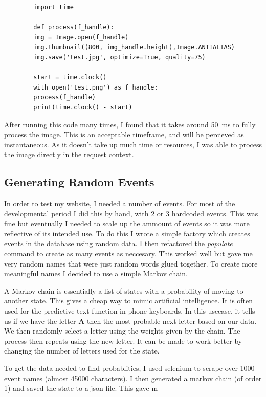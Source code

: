 \documentclass[a4paper,oneside,12pt,draft]{report}
\begin{document}
	\lstset{language=python}
	\begin{lstlisting}
		import time

		def process(f_handle):
		img = Image.open(f_handle)
		img.thumbnail((800, img_handle.height),Image.ANTIALIAS)
		img.save('test.jpg', optimize=True, quality=75)

		start = time.clock()
		with open('test.png') as f_handle:
		process(f_handle)
		print(time.clock() - start)
	\end{lstlisting}

	After running this code many times, I found that it takes around \SI{50}{\milli\second} to fully process the image. This is an acceptable timeframe, and will be percieved as instantaneous. As it doesn't take up much time or resources, I was able to process the image directly in the request context.

	\subsection{Generating Random Events}
	In order to test my website, I needed a number of events. For most of the developmental period I did this by hand, with 2 or 3 hardcoded events. This was fine but eventually I needed to scale up the ammount of events so it was more reflective of its intended use. To do this I wrote a simple factory which creates events in the database using random data. I then refactored the \textit{populate} command to create as many events as neccesary. This worked well but gave me very random names that were just random words glued together. To create more meaningful names I decided to use a simple Markov chain.

	A Markov chain is essentially a list of states with a probability of moving to another state. This gives a cheap way to mimic artificial intelligence. It is often used for the predictive text function in phone keyboards. In this usecase, it tells us if we have the letter \textbf{A} then the most probable next letter based on our data. We then randomly select a letter using the weights given by the chain. The process then repeats using the new letter. It can be made to work better by changing the number of letters used for the state.

	To get the data needed to find probablities, I used selenium to scrape over 1000 event names (almost 45000 characters). I then generated a markov chain (of order 1) and saved the state to a json file. This gave m
\end{document}
